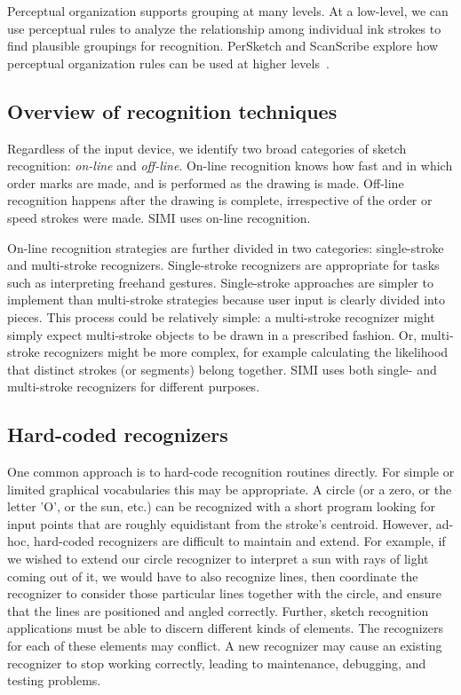 

Perceptual organization supports grouping at many levels. At a
low-level, we can use perceptual rules to analyze the relationship
among individual ink strokes to find plausible groupings for
recognition. PerSketch and ScanScribe explore how perceptual
organization rules can be used at higher
levels~\cite{saund-persketch,saund-perceptual}. 

\subsection{Overview of recognition techniques}
\label{sec:recognition-techniques}

Regardless of the input device, we identify two broad categories of
sketch recognition: \textit{on-line} and \textit{off-line}. On-line
recognition knows how fast and in which order marks are made, and is
performed as the drawing is made. Off-line recognition happens after
the drawing is complete, irrespective of the order or speed strokes
were made. SIMI uses on-line recognition.

On-line recognition strategies are further divided in two categories:
single-stroke and multi-stroke recognizers. Single-stroke recognizers
are appropriate for tasks such as interpreting freehand
gestures. Single-stroke approaches are simpler to implement than
multi-stroke strategies because user input is clearly divided into
pieces. This process could be relatively simple: a multi-stroke
recognizer might simply expect multi-stroke objects to be drawn in a
prescribed fashion. Or, multi-stroke recognizers might be more
complex, for example calculating the likelihood that distinct strokes
(or segments) belong together. SIMI uses both single- and multi-stroke
recognizers for different purposes.

\subsection{Hard-coded recognizers}
\label{sec:recognition-hard-coded}

One common approach is to hard-code recognition routines directly. For
simple or limited graphical vocabularies this may be appropriate. A
circle (or a zero, or the letter 'O', or the sun, etc.)  can be
recognized with a short program looking for input points that are
roughly equidistant from the stroke's centroid. However, ad-hoc,
hard-coded recognizers are difficult to maintain and extend. For
example, if we wished to extend our circle recognizer to interpret a
sun with rays of light coming out of it, we would have to also
recognize lines, then coordinate the recognizer to consider those
particular lines together with the circle, and ensure that the lines
are positioned and angled correctly. Further, sketch recognition
applications must be able to discern different kinds of elements. The
recognizers for each of these elements may conflict. A new recognizer
may cause an existing recognizer to stop working correctly, leading to
maintenance, debugging, and testing problems.

